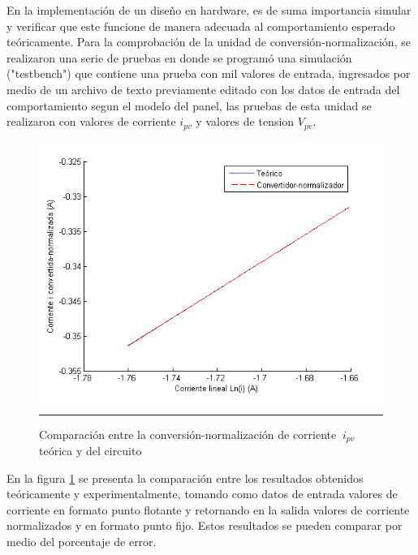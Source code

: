 En la implementación de un diseño en hardware, es de suma importancia simular y verificar que este funcione de manera adecuada al comportamiento esperado teóricamente. Para la comprobación de la unidad de conversión-normalización, se realizaron una serie de pruebas en donde se programó una simulación ("testbench") que contiene una prueba con mil valores de entrada, ingresados por medio de un archivo de texto previamente editado con los datos de entrada del comportamiento segun el modelo del panel, las pruebas de esta unidad se realizaron con valores de corriente $ i_{pv}$ y valores de tension $ V_{pv}$. 


  \begin{figure}[H]
  \centering
    \includegraphics[scale=0.7]{./Convertidor-normalizador_I.png}
    \rule{35em}{0.5pt}
  \caption[Comparación entre la conversión-normalización de corriente $\ i_{pv}$ teórica y del circuito]{Comparación entre la conversión-normalización de corriente $\ i_{pv}$ teórica y del circuito}
  \label{fig:NORMI}
\end{figure}

En la figura \ref{fig:NORMI} se presenta la comparación entre los resultados obtenidos teóricamente y experimentalmente, tomando como datos de entrada  valores de corriente en formato punto flotante y retornando en la salida valores de corriente normalizados y en formato punto fijo. Estos resultados se pueden comparar por medio del porcentaje de error.  

